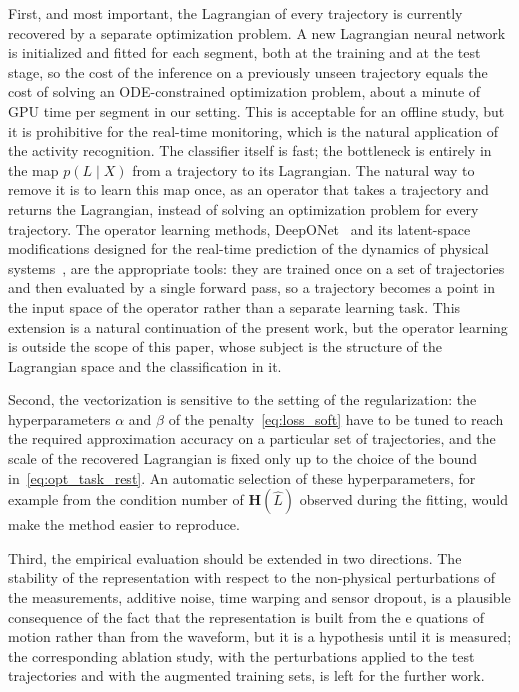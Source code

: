 \documentclass[sn-mathphys-num]{sn-jnl}
\theoremstyle{thmstylethree}
\theoremstyle{thmstyletwo}
\theoremstyle{thmstyleone}
\begin{document}
First, and most important, the Lagrangian of every trajectory is currently recovered by a separate optimization problem. A new Lagrangian neural network is initialized and fitted for each segment, both at the training and at the test stage, so the cost of the inference on a previously unseen trajectory equals the cost of solving an ODE-constrained optimization problem, about a minute of GPU time per segment in our setting. This is acceptable for an offline study, but it is prohibitive for the real-time monitoring, which is the natural application of the activity recognition. The classifier itself is fast; the bottleneck is entirely in the map $p(L \mid X)$ from a trajectory to its Lagrangian. The natural way to remove it is to learn this map once, as an operator that takes a trajectory and returns the Lagrangian, instead of solving an optimization problem for every trajectory. The operator learning methods, DeepONet~\cite{DeepONet} and its latent-space modifications designed for the real-time prediction of the dynamics of physical systems~\cite{LatentDeepONet}, are the appropriate tools: they are trained once on a set of trajectories and then evaluated by a single forward pass, so a trajectory becomes a point in the input space of the operator rather than a separate learning task. This extension is a natural continuation of the present work, but the operator learning is outside the scope of this paper, whose subject is the structure of the Lagrangian space and the classification in it.

Second, the vectorization is sensitive to the setting of the regularization: the hyperparameters $\alpha$ and $\beta$ of the penalty~\eqref{eq:loss_soft} have to be tuned to reach the required approximation accuracy on a particular set of trajectories, and the scale of the recovered Lagrangian is fixed only up to the choice of the bound in~\eqref{eq:opt_task_rest}. An automatic selection of these hyperparameters, for example from the condition number of $\mathbf{H}(\hat{L})$ observed during the fitting, would make the method easier to reproduce.

Third, the empirical evaluation should be extended in two directions. The stability of the representation with respect to the non-physical perturbations 
of the measurements, additive noise, time warping and sensor dropout, is a plausible consequence of the fact that the representation is built from the e
quations of motion rather than from the waveform, but it is a hypothesis until it is measured; the corresponding ablation study, 
with the perturbations applied to the test trajectories and with the augmented training sets, is left for the further work.


\end{document}
